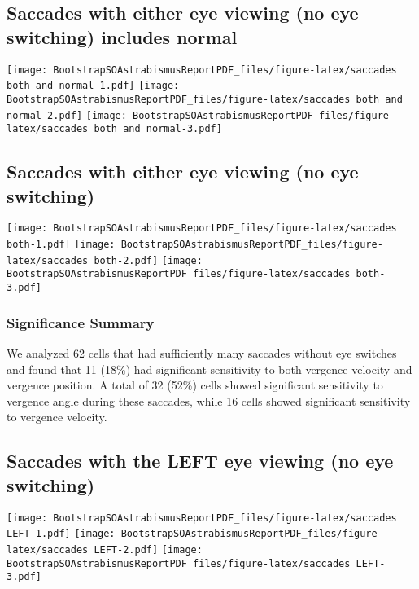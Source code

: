 \documentclass[]{article}
\begin{document}
\subsection{Saccades with either eye viewing (no eye switching) includes
normal}\label{saccades-with-either-eye-viewing-no-eye-switching-includes-normal}

\texttt{[image: BootstrapSOAstrabismusReportPDF\_files/figure-latex/saccades both and normal-1.pdf]}
\texttt{[image: BootstrapSOAstrabismusReportPDF\_files/figure-latex/saccades both and normal-2.pdf]}
\texttt{[image: BootstrapSOAstrabismusReportPDF\_files/figure-latex/saccades both and normal-3.pdf]}

\subsection{Saccades with either eye viewing (no eye
switching)}\label{saccades-with-either-eye-viewing-no-eye-switching}

\texttt{[image: BootstrapSOAstrabismusReportPDF\_files/figure-latex/saccades both-1.pdf]}
\texttt{[image: BootstrapSOAstrabismusReportPDF\_files/figure-latex/saccades both-2.pdf]}
\texttt{[image: BootstrapSOAstrabismusReportPDF\_files/figure-latex/saccades both-3.pdf]}

\subsubsection{Significance Summary}\label{significance-summary-1}

We analyzed 62 cells that had sufficiently many saccades without eye
switches and found that 11 (18\%) had significant sensitivity to both
vergence velocity and vergence position. A total of 32 (52\%) cells
showed significant sensitivity to vergence angle during these saccades,
while 16 cells showed significant sensitivity to vergence velocity.

\subsection{Saccades with the LEFT eye viewing (no eye
switching)}\label{saccades-with-the-left-eye-viewing-no-eye-switching}

\texttt{[image: BootstrapSOAstrabismusReportPDF\_files/figure-latex/saccades LEFT-1.pdf]}
\texttt{[image: BootstrapSOAstrabismusReportPDF\_files/figure-latex/saccades LEFT-2.pdf]}
\texttt{[image: BootstrapSOAstrabismusReportPDF\_files/figure-latex/saccades LEFT-3.pdf]}
\end{document}
